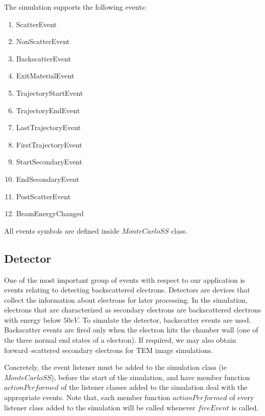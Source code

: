 The simulation supports the following events:
\begin{enumerate}
\item ScatterEvent
\item NonScatterEvent
\item BackscatterEvent
\item ExitMaterialEvent
\item TrajectoryStartEvent
\item TrajectoryEndEvent
\item LastTrajectoryEvent
\item FirstTrajectoryEvent
\item StartSecondaryEvent
\item EndSecondaryEvent
\item PostScatterEvent
\item BeamEnergyChanged
\end{enumerate}
All events symbols are defined inside $MonteCarloSS$ class.

\subsection{Detector}\label{subsec:detector}
One of the most important group of events with respect to our application is events relating to detecting backscattered electrons. Detectors are devices that collect the information about electrons for later processing. In the simulation, electrons that are characterized as secondary electrons are backscattered electrons with energy below $50 eV$. To simulate the detector, backscatter events are used. Backscatter events are fired only when the electron hits the chamber wall (one of the three normal end states of a electron). If required, we may also obtain forward--scattered secondary electrons for TEM image simulations.

Concretely, the event listener must be added to the simulation class (ie $MonteCarloSS$), before the start of the simulation, and have member function $actionPerformed$ of the listener classes added to the simulation deal with the appropriate events. Note that, each member function $actionPerformed$ of every listener class added to the simulation will be called whenever $fireEvent$ is called.